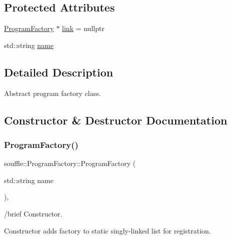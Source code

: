 \subsection*{Protected Attributes}
\begin{DoxyCompactItemize}
\item 
\hyperlink{classsouffle_1_1_program_factory}{Program\+Factory} $\ast$ \hyperlink{classsouffle_1_1_program_factory_ac080f0c3db8b720c3c3b47935f75bd17}{link} = nullptr
\item 
std\+::string \hyperlink{classsouffle_1_1_program_factory_a9dc30a356790b8543aa5dbf285eca4da}{name}
\end{DoxyCompactItemize}


\subsection{Detailed Description}
Abstract program factory class. 

\subsection{Constructor \& Destructor Documentation}
\mbox{\label{classsouffle_1_1_program_factory_a3895c35be3c180fef60ab3ca4311fb72}} 
\subsubsection{\texorpdfstring{Program\+Factory()}{ProgramFactory()}}
{\footnotesize\ttfamily souffle\+::\+Program\+Factory\+::\+Program\+Factory (\begin{DoxyParamCaption}\item[{std\+::string}]{name }\end{DoxyParamCaption})\hspace{0.3cm}{\ttfamily [inline]}, {\ttfamily [protected]}}

/brief Constructor.

Constructor adds factory to static singly-\/linked list for registration. \mbox{\label{classsouffle_1_1_program_factory_ad3b0b3fa4b09a6853e95a61d432229ac}} 
